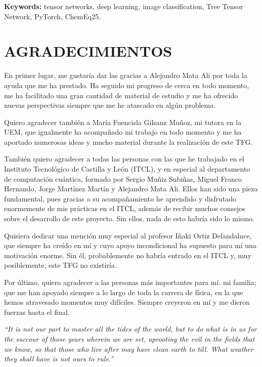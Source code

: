 \textbf{Keywords:} tensor networks, deep learning, image classification, Tree Tensor Network, PyTorch, ChemEq25.

\chapter*{AGRADECIMIENTOS}\label{sec:Agradecimientos}

En primer lugar, me gustaría dar las gracias a Alejandro Mata Ali por toda la ayuda que me ha prestado. Ha seguido mi progreso de cerca en todo momento, me ha facilitado una gran cantidad de material de estudio y me ha ofrecido nuevas perspectivas siempre que me he atascado en algún problema.

Quiero agradecer también a María Fuencisla Gilsanz Muñoz, mi tutora en la UEM, que igualmente ha acompañado mi trabajo en todo momento y me ha aportado numerosas ideas y mucho material durante la realización de este TFG.

También quiero agradecer a todas las personas con las que he trabajado en el Instituto Tecnológico de Castilla y León (ITCL), y en especial al departamento de computación cuántica, formado por Sergio Muñiz Subiñas, Miguel Franco Hernando, Jorge Martínez Martín y Alejandro Mata Ali. Ellos han sido una pieza fundamental, pues gracias a su acompañamiento he aprendido y disfrutado enormemente de mis prácticas en el ITCL, además de recibir muchos consejos sobre el desarrollo de este proyecto. Sin ellos, nada de esto habría sido lo mismo.

Quisiera dedicar una mención muy especial al profesor Iñaki Ortiz Delandaluce, que siempre ha creído en mí y cuyo apoyo incondicional ha supuesto para mí una motivación enorme. Sin él, probablemente no habría entrado en el ITCL y, muy posiblemente, este TFG no existiría.

Por último, quiero agradecer a las personas más importantes para mí: mi familia; que me han apoyado siempre a lo largo de toda la carrera de física, en la que hemos atravesado momentos muy difíciles. Siempre creyeron en mí y me dieron fuerzas hasta el final.

\clearpage
{}

\textit{``It is not our part to master all the tides of the world, but to do what is in us for the succour of those years wherein we are set, uprooting the evil in the fields that we know, so that those who live after may have clean earth to till. What weather they shall have is not ours to rule.''} 

